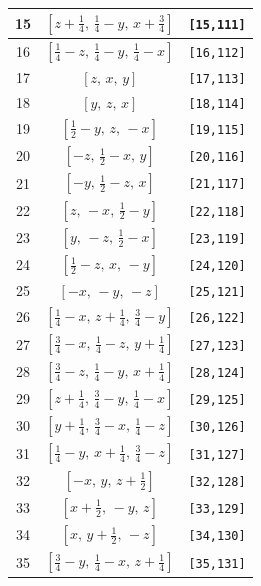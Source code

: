 \documentclass[fleqn,8pt]{jsarticle}
\begin{document}
\begin{longtable}{ccc}
15 & $\left[ z + \frac{1}{4},\, \frac{1}{4} - y,\, x + \frac{3}{4} \right]$ & {\tt [15,111]} \\ \hline
16 & $\left[ \frac{1}{4} - z,\, \frac{1}{4} - y,\, \frac{1}{4} - x \right]$ & {\tt [16,112]} \\ \hline
17 & $\left[ z,\, x,\, y \right]$ & {\tt [17,113]} \\ \hline
18 & $\left[ y,\, z,\, x \right]$ & {\tt [18,114]} \\ \hline
19 & $\left[ \frac{1}{2} - y,\, z,\, - x \right]$ & {\tt [19,115]} \\ \hline
20 & $\left[ - z,\, \frac{1}{2} - x,\, y \right]$ & {\tt [20,116]} \\ \hline
21 & $\left[ - y,\, \frac{1}{2} - z,\, x \right]$ & {\tt [21,117]} \\ \hline
22 & $\left[ z,\, - x,\, \frac{1}{2} - y \right]$ & {\tt [22,118]} \\ \hline
23 & $\left[ y,\, - z,\, \frac{1}{2} - x \right]$ & {\tt [23,119]} \\ \hline
24 & $\left[ \frac{1}{2} - z,\, x,\, - y \right]$ & {\tt [24,120]} \\ \hline
25 & $\left[ - x,\, - y,\, - z \right]$ & {\tt [25,121]} \\ \hline
26 & $\left[ \frac{1}{4} - x,\, z + \frac{1}{4},\, \frac{3}{4} - y \right]$ & {\tt [26,122]} \\ \hline
27 & $\left[ \frac{3}{4} - x,\, \frac{1}{4} - z,\, y + \frac{1}{4} \right]$ & {\tt [27,123]} \\ \hline
28 & $\left[ \frac{3}{4} - z,\, \frac{1}{4} - y,\, x + \frac{1}{4} \right]$ & {\tt [28,124]} \\ \hline
29 & $\left[ z + \frac{1}{4},\, \frac{3}{4} - y,\, \frac{1}{4} - x \right]$ & {\tt [29,125]} \\ \hline
30 & $\left[ y + \frac{1}{4},\, \frac{3}{4} - x,\, \frac{1}{4} - z \right]$ & {\tt [30,126]} \\ \hline
31 & $\left[ \frac{1}{4} - y,\, x + \frac{1}{4},\, \frac{3}{4} - z \right]$ & {\tt [31,127]} \\ \hline
32 & $\left[ - x,\, y,\, z + \frac{1}{2} \right]$ & {\tt [32,128]} \\ \hline
33 & $\left[ x + \frac{1}{2},\, - y,\, z \right]$ & {\tt [33,129]} \\ \hline
34 & $\left[ x,\, y + \frac{1}{2},\, - z \right]$ & {\tt [34,130]} \\ \hline
35 & $\left[ \frac{3}{4} - y,\, \frac{1}{4} - x,\, z + \frac{1}{4} \right]$ & {\tt [35,131]} \\ \hline

\end{longtable}
\end{document}
